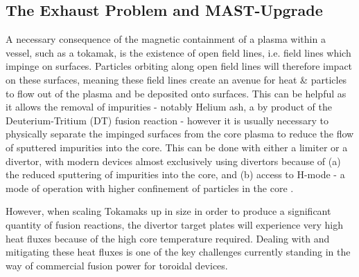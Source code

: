\documentclass[a4paper, 11pt]{article} %
\begin{document}
\subsection{\label{subsec:exhaust}The Exhaust Problem and MAST-Upgrade}
	A necessary consequence of the magnetic containment of a plasma within a vessel, such as a tokamak, is the existence of open field lines, i.e. field lines which impinge on surfaces. 
	Particles orbiting along open field lines will therefore impact on these surfaces, meaning these field lines create an avenue for heat \& particles to flow out of the plasma and be deposited onto surfaces.
	This can be helpful as it allows the removal of impurities - notably Helium ash, a by product of the Deuterium-Tritium (DT) fusion reaction - however it is usually necessary to physically separate the impinged surfaces from the core plasma to reduce the flow of sputtered impurities into the core. 
	This can be done with either a limiter or a divertor\cite{Wesson2011}, with modern devices almost exclusively using divertors because of (a) the reduced sputtering of impurities into the core, and (b) access to H-mode - a mode of operation with higher confinement of particles in the core \cite{Itoh1989}.
	
%	
	However, when scaling Tokamaks up in size in order to produce a significant quantity of fusion reactions, the divertor target plates will experience very high heat fluxes because of the high core temperature required.  
	Dealing with and mitigating these heat fluxes is one of the key challenges currently standing in the way of commercial fusion power for toroidal devices\cite{Romanelli2012}. 	 
	
\end{document}
